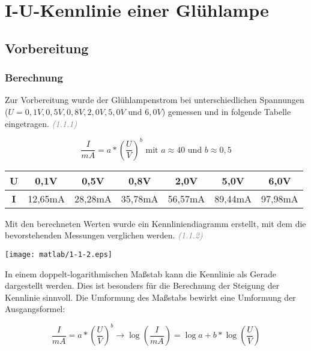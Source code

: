 \chapter{ I-U-Kennlinie einer Glühlampe}


\section{Vorbereitung}
	\subsection{Berechnung}
	
	Zur Vorbereitung wurde der Glühlampenstrom bei unterschiedlichen Spannungen \\($U = 0,1V, 0,5V, 0,8V, 2,0V, 5,0V \text{ und } 6,0V$) gemessen und in folgende Tabelle eingetragen. \textcolor{gray}{\textit{(1.1.1)}}
	
	\begin{equation*}
		\frac{I}{mA} = a*(\frac{U}{V})^b \text{ mit } a \approx 40 \text{ und } b \approx 0,5
	\end{equation*}
	\hspace{0.5cm}
	\begin{center}
	\begin{tabular}{|c|c|c|c|c|c|c|}
		\hline 
		\textbf{U}& 0,1V & 0,5V & 0,8V & 2,0V & 5,0V & 6,0V  \\ 
		\hline 
		\textbf{I}& 12,65mA & 28,28mA & 35,78mA & 56,57mA & 89,44mA & 97,98mA \\ 
		\hline 
	\end{tabular} 
\end{center}

\hspace{0.5cm}

Mit den berechneten Werten wurde ein Kennliniendiagramm erstellt, mit dem die bevorstehenden Messungen verglichen werden. \textcolor{gray}{\textit{(1.1.2)}}

\begin{center}
	\texttt{[image: matlab/1-1-2.eps]}
\end{center}

\newpage
\thispagestyle{fancy}
In einem doppelt-logarithmischen Maßstab kann die Kennlinie als Gerade dargestellt werden. Dies ist besonders für die Berechnung der Steigung der Kennlinie sinnvoll. Die Umformung des Maßstabs bewirkt eine Umformung der Ausgangsformel:

\begin{equation*}
\frac{I}{mA} = a*(\frac{U}{V})^b \rightarrow \log(\frac{I}{mA}) = \log a+ b * \log(\frac{U}{V})
\end{equation*}

